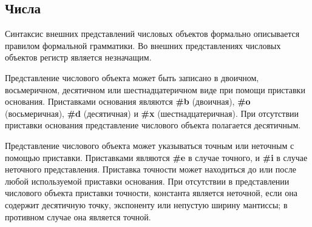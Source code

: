 \subsection{Числа}
\label{numbernotations}

Синтаксис внешних представлений числовых объектов формально описывается правилом 
формальной грамматики. Во внешних представлениях числовых объектов регистр является незначащим.

Представление числового объекта может быть записано в двоичном, восьмеричном, десятичном или
шестнадцатеричном виде при помощи приставки основания. Приставками основания являются
{\bfseries\cf \#b} (двоичная), {\bfseries\cf \#o} (восьмеричная),
{\bfseries\cf \#d} (десятичная) и {\bfseries\cf \#x}
(шестнадцатеричная). При отсутствии приставки основания представление числового объекта
полагается десятичным.

Представление числового объекта может указываться точным или неточным с помощью
приставки. Приставками являются {\bfseries\cf \#e} в случае точного, и {\bfseries\cf
  \#i} в случае неточного представления. Приставка точности может находиться до
или после любой используемой приставки основания. При отсутствии в представлении числового объекта
приставки точности, константа является неточной, если она содержит десятичную точку, экспоненту или
непустую ширину мантиссы; в противном случае она является точной.

